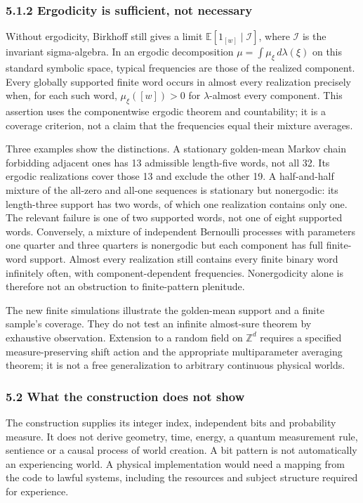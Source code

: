 \documentclass[
  10pt,
  a4paper,
]{article}
\begin{document}
\subsubsection{5.1.2 Ergodicity is sufficient, not
necessary}\label{ergodicity-is-sufficient-not-necessary}

Without ergodicity, Birkhoff still gives a limit
\(\mathbb E[1_{[w]}\mid\mathcal I]\), where \(\mathcal I\) is the
invariant sigma-algebra. In an ergodic decomposition
\(\mu=\int\mu_\xi\,d\lambda(\xi)\) on this standard symbolic space,
typical frequencies are those of the realized component. Every globally
supported finite word occurs in almost every realization precisely when,
for each such word, \(\mu_\xi([w])>0\) for \(\lambda\)-almost every
component. This assertion uses the componentwise ergodic theorem and
countability; it is a coverage criterion, not a claim that the
frequencies equal their mixture averages.

Three examples show the distinctions. A stationary golden-mean Markov
chain forbidding adjacent ones has 13 admissible length-five words, not
all 32. Its ergodic realizations cover those 13 and exclude the other
19. A half-and-half mixture of the all-zero and all-one sequences is
stationary but nonergodic: its length-three support has two words, of
which one realization contains only one. The relevant failure is one of
two supported words, not one of eight supported words. Conversely, a
mixture of independent Bernoulli processes with parameters one quarter
and three quarters is nonergodic but each component has full finite-word
support. Almost every realization still contains every finite binary
word infinitely often, with component-dependent frequencies.
Nonergodicity alone is therefore not an obstruction to finite-pattern
plenitude.

The new finite simulations illustrate the golden-mean support and a
finite sample's coverage. They do not test an infinite almost-sure
theorem by exhaustive observation. Extension to a random field on
\(\mathbb Z^d\) requires a specified measure-preserving shift action and
the appropriate multiparameter averaging theorem; it is not a free
generalization to arbitrary continuous physical worlds.

\subsubsection{5.2 What the construction does not
show}\label{what-the-construction-does-not-show}

The construction supplies its integer index, independent bits and
probability measure. It does not derive geometry, time, energy, a
quantum measurement rule, sentience or a causal process of world
creation. A bit pattern is not automatically an experiencing world. A
physical implementation would need a mapping from the code to lawful
systems, including the resources and subject structure required for
experience.
\end{document}
